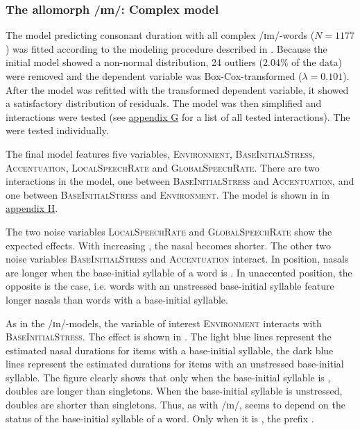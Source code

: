 \subsubsection{The allomorph /ɪm/: Complex model}


The model predicting consonant duration with all complex /ɪm/-words ($N=1177$) was fitted according to the modeling procedure described in .
Because the initial model showed a non-normal distribution,  24 outliers (2.04\% of the data) were removed and the dependent variable was Box-Cox-transformed ($\lambda = 0.101$).  
After the model was refitted with the transformed dependent variable, it showed a satisfactory distribution of residuals. The model was then simplified and interactions were tested (see \hyperref[Appendix G Summaries of tested interactions in experimental study]{appendix G} for a list of all tested interactions). 
The  were tested individually.



The final model features five variables, \textsc{Environment}, \textsc{BaseInitialStress}, \textsc{Accentuation}, \textsc{LocalSpeechRate} and \textsc{GlobalSpeechRate}. There are two interactions in the model, one between \textsc{BaseInitialStress} and \textsc{Accentuation}, and one between \textsc{BaseInitialStress} and \textsc{Environment}. The model is shown in  in \hyperref[Appendix H: Model Summaries Experiment]{appendix H}.

The two noise variables \textsc{LocalSpeechRate} and \textsc{GlobalSpeechRate} show the expected effects. With increasing , the nasal becomes shorter.
 The other two noise variables \textsc{BaseInitialStress} and \textsc{Accentuation} interact. In  position, nasals are longer when the base-initial syllable of a word is . In unaccented position, the opposite is the case, i.e. words with an unstressed base-initial syllable feature longer nasals than words with a  base-initial syllable. 
 


As in the /ɪn/-models, the variable of interest \textsc{Environment} interacts with \textsc{BaseInitialStress}. The effect is shown in . 
The light blue lines represent the estimated nasal durations for items with a  base-initial syllable, the dark blue lines represent  the estimated durations for items with an unstressed base-initial syllable.
The figure clearly shows that 
 only when the base-initial syllable is , doubles are  longer than singletons. When the base-initial syllable is unstressed, doubles are shorter than singletons. 
Thus, as with /ɪn/,  seems to depend on the  status of the base-initial syllable of a word. Only when it is , the prefix  .


